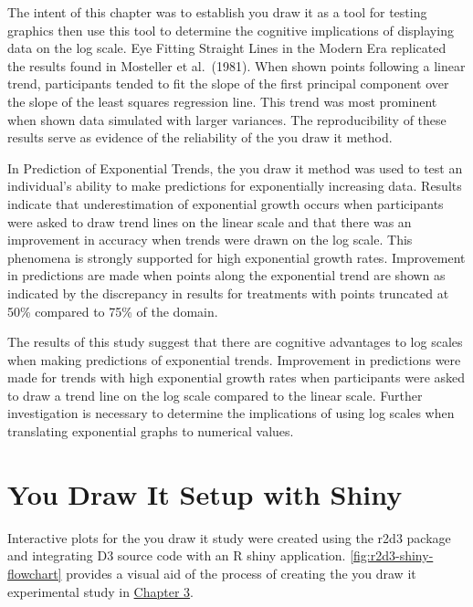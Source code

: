 \documentclass[print]{nuthesis}
\begin{document}
The intent of this chapter was to establish you draw it as a tool for testing graphics then use this tool to determine the cognitive implications of displaying data on the log scale.
Eye Fitting Straight Lines in the Modern Era replicated the results found in Mosteller et al.~(1981).
When shown points following a linear trend, participants tended to fit the slope of the first principal component over the slope of the least squares regression line.
This trend was most prominent when shown data simulated with larger variances.
The reproducibility of these results serve as evidence of the reliability of the you draw it method.

In Prediction of Exponential Trends, the you draw it method was used to test an individual's ability to make predictions for exponentially increasing data.
Results indicate that underestimation of exponential growth occurs when participants were asked to draw trend lines on the linear scale and that there was an improvement in accuracy when trends were drawn on the log scale.
This phenomena is strongly supported for high exponential growth rates.
Improvement in predictions are made when points along the exponential trend are shown as indicated by the discrepancy in results for treatments with points truncated at 50\% compared to 75\% of the domain.

The results of this study suggest that there are cognitive advantages to log scales when making predictions of exponential trends.
Improvement in predictions were made for trends with high exponential growth rates when participants were asked to draw a trend line on the log scale compared to the linear scale.
Further investigation is necessary to determine the implications of using log scales when translating exponential graphs to numerical values.

\appendix

\hypertarget{youdrawit-with-shiny}{%
\chapter{You Draw It Setup with Shiny}\label{youdrawit-with-shiny}}

Interactive plots for the you draw it study were created using the r2d3 package and integrating D3 source code with an R shiny application.
\cref{fig:r2d3-shiny-flowchart} provides a visual aid of the process of creating the you draw it experimental study in \protect\hyperlink{youdrawit}{Chapter 3}.
\end{document}
